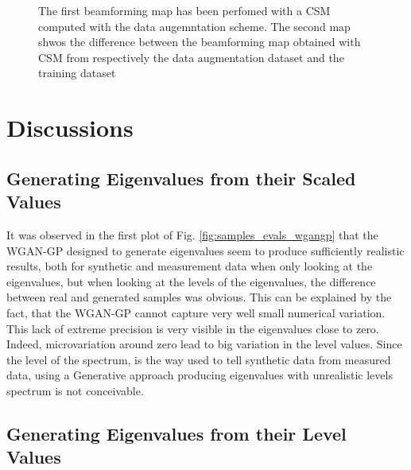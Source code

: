 \documentclass[11pt,a4paper,twoside]{report}
\begin{document}
\begin{figure}
    \centering
    \caption{The first beamforming map has been perfomed with a CSM computed with the data augemntation scheme. The second map shwos the difference between the beamforming map obtained with CSM from respectively the data augmentation dataset and the training dataset}
    \label{fig:beamforming_map_data_augmentation}
\end{figure}

\chapter{Discussions}

\section{Generating Eigenvalues from their Scaled Values}

It was observed in the first plot of Fig. \ref{fig:samples_evals_wgangp} that the WGAN-GP designed to generate eigenvalues seem to produce sufficiently realistic results, both for synthetic and measurement data when only looking at the eigenvalues, but when looking at the levels of the eigenvalues, the difference between real and generated samples was obvious. This can be explained by the fact, that the WGAN-GP cannot capture very well small numerical variation. This lack of extreme precision is very visible in the eigenvalues close to zero. Indeed, microvariation around zero lead to big variation in the level values. Since the level of the spectrum, is the way used to tell synthetic data from measured data, using a Generative approach producing eigenvalues with unrealistic levels spectrum is not conceivable. 

\section{Generating Eigenvalues from their Level Values}
\end{document}
